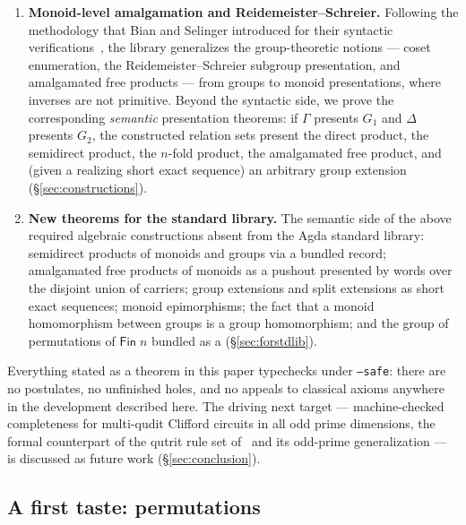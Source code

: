 \begin{enumerate}
\item[(3)] \textbf{Monoid-level amalgamation and Reidemeister--Schreier.}
  Following the methodology that Bian and Selinger introduced for their
  syntactic verifications~\cite{bian2023cliffordt2,bian2023cliffordcs3,
  bian2023thesis}, the library generalizes the group-theoretic notions ---
  coset enumeration, the Reidemeister--Schreier subgroup presentation, and
  amalgamated free products --- from groups to monoid presentations, where
  inverses are not primitive.  Beyond the syntactic side, we prove the
  corresponding \emph{semantic} presentation theorems: if $\Gamma$ presents
  $G_1$ and $\Delta$ presents $G_2$, the constructed relation sets present
  the direct product, the semidirect product, the $n$-fold product, the
  amalgamated free product, and (given a realizing short exact sequence) an
  arbitrary group extension (\S\ref{sec:constructions}).

\item[(4)] \textbf{New theorems for the standard library.}  The semantic
  side of the above required algebraic constructions absent from the Agda
  standard library: semidirect products of monoids and groups via a bundled
   record; amalgamated free products of monoids as a pushout
  presented by words over the disjoint union of carriers; group extensions
  and split extensions as short exact sequences; monoid epimorphisms; the
  fact that a monoid homomorphism between groups is a group homomorphism;
  and the group of permutations of $\mathsf{Fin}\;n$ bundled as a
   (\S\ref{sec:forstdlib}).
\end{enumerate}

Everything stated as a theorem in this paper typechecks under
\texttt{--safe}: there are no postulates, no unfinished holes, and no
appeals to classical axioms anywhere in the development described here.  The
driving next target --- machine-checked completeness for multi-qudit
Clifford circuits in all odd prime dimensions, the formal counterpart of
the qutrit rule set of~\cite{li2025qutrit} and its odd-prime
generalization --- is discussed as future work (\S\ref{sec:conclusion}).

\subsection{A first taste: permutations}\label{sec:taste}

